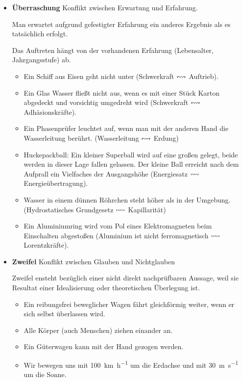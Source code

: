 \begin{itemize}
	\item {\bf \"{U}berraschung}
	Konflikt zwischen Erwartung und Erfahrung.
	
	Man erwartet aufgrund gefestigter Erfahrung ein anderes
	Ergebnis als es tats\"{a}chlich erfolgt.
	
	Das Auftreten h\"{a}ngt von der vorhandenen Erfahrung
	(Lebensalter, Jahrgangsstufe) ab.
	\begin{beisp}
		\begin{itemize}
		\item
		Ein Schiff aus Eisen geht nicht
		unter (Schwerkraft $\leftrightsquigarrow$ Auftrieb).
		\item
		Ein Glas Wasser flie{\ss}t nicht aus, wenn es mit einer St\"{u}ck
		Karton abgedeckt und vorsichtig umgedreht wird
		(Schwerkraft $\leftrightsquigarrow$ Adh\"{a}sionskr\"{a}fte).
		\item
		Ein Phasenpr\"{u}fer leuchtet auf, wenn man mit der anderen Hand
		die Wasserleitung ber\"{u}hrt. (Wasserleitung $\leftrightsquigarrow$ Erdung)
		\item
		Huckepackball: Ein kleiner Superball wird auf eine gro{\ss}en gelegt,
		beide werden in dieser Lage fallen gelassen.
		Der kleine Ball erreicht nach dem Aufprall ein
		Vielfaches der Ausgangsh\"{o}he
		(Energiesatz $\leftrightsquigarrow$ Energie\"{u}bertragung).
		\item
		Wasser in einem d\"{u}nnen R\"{o}hrchen steht h\"{o}her als in der Umgebung.
		(Hydrostatisches Grundgesetz $\leftrightsquigarrow$ Kapillarit\"{a}t)
		\item
		Ein Aluminiumring wird vom Pol eines Elektromagneten beim
		Einschalten abgesto{\ss}en
		(Aluminium ist nicht ferromagnetisch $\leftrightsquigarrow$ Lorentzkr\"{a}fte).
		\end{itemize}
	\end{beisp}
	
	
	\item {\bf Zweifel} Konflikt zwischen Glauben und Nichtglauben
	
	Zweifel ensteht bez\"{u}glich einer nicht direkt nachpr\"{u}fbaren
	Aussage, weil sie Resultat einer Idealisierung oder theoretischen
	\"{U}berlegung ist.
	
	\begin{beisp}
		\begin{itemize}
		\item
		Ein reibungsfrei beweglicher Wagen f\"{a}hrt gleichf\"{o}rmig weiter,
		wenn er sich selbst \"{u}berlassen wird.
		\item
		Alle K\"{o}rper (auch Menschen) ziehen einander an.
		\item
		Ein G\"{u}terwagen kann mit der Hand gezogen werden.
		\item
		Wir bewegen uns mit \SI{100}{\kilo\meter\per\hour} um die Erdachse und mit \SI{30}{\meter\per\second}
		um die Sonne.
		\end{itemize}
	\end{beisp}
	

\end{itemize}
